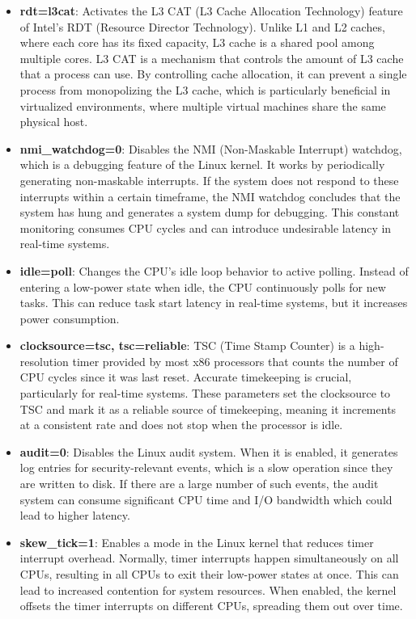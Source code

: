 \documentclass[MMR,Master,english]{twbook}
\begin{document}
\begin{itemize}
	\item \textbf{rdt=l3cat}: Activates the L3 CAT (L3 Cache Allocation Technology) feature of Intel’s RDT (Resource Director Technology). Unlike L1 and L2 caches, where each core has its fixed capacity, L3 cache is a shared pool among multiple cores. L3 CAT is a mechanism that controls the amount of L3 cache that a process can use. By controlling cache allocation, it can prevent a single process from monopolizing the L3 cache, which is particularly beneficial in virtualized environments, where multiple virtual machines share the same physical host.
	\item \textbf{nmi\_watchdog=0}: Disables the NMI (Non-Maskable Interrupt) watchdog, which is a debugging feature of the Linux kernel. It works by periodically generating non-maskable interrupts. If the system does not respond to these interrupts within a certain timeframe, the NMI watchdog concludes that the system has hung and generates a system dump for debugging.  This constant monitoring consumes CPU cycles and can introduce undesirable latency in real-time systems.
	\item \textbf{idle=poll}: Changes the CPU’s idle loop behavior to active polling. Instead of entering a low-power state when idle, the CPU continuously polls for new tasks. This can reduce task start latency in real-time systems, but it increases power consumption.
	\item \textbf{clocksource=tsc, tsc=reliable}: TSC (Time Stamp Counter) is a high-resolution timer provided by most x86 processors that counts the number of CPU cycles since it was last reset. Accurate timekeeping is crucial, particularly for real-time systems. These parameters set the clocksource to TSC and mark it as a reliable source of timekeeping, meaning it increments at a consistent rate and does not stop when the processor is idle. 
	\item \textbf{audit=0}: Disables the Linux audit system. When it is enabled, it generates log entries for security-relevant events, which is a slow operation since they are written to disk. If there are a large number of such events, the audit system can consume significant CPU time and I/O bandwidth which could lead to higher latency.
	\item \textbf{skew\_tick=1}: Enables a mode in the Linux kernel that reduces timer interrupt overhead. Normally, timer interrupts happen simultaneously on all CPUs, resulting in all CPUs to exit their low-power states at once. This can lead to increased contention for system resources. When enabled, the kernel offsets the timer interrupts on different CPUs, spreading them out over time.

\end{itemize}
\end{document}

